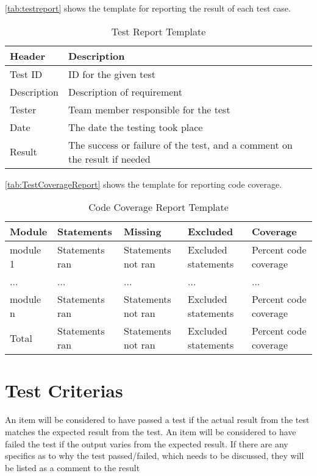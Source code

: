 \autoref{tab:testreport} shows the template for reporting the result of each test case.

\begin{table}[htb] \small \center
\caption{Test Report Template \label{tab:testreport}}
\begin{tabular}{l l}
	\toprule
	Header & Description \\
	\midrule
	Test ID & ID for the given test \\
	Description & Description of requirement \\
	Tester & Team member responsible for the test \\
	Date & The date the testing took place \\
	Result & The success or failure of the test, and a comment on the result if needed \\
	\bottomrule
\end{tabular}
\end{table}

\autoref{tab:TestCoverageReport} shows the template for reporting code coverage.

\begin{table}[!htb]\footnotesize\center
	\caption{Code Coverage Report Template\label{tab:TestCoverageReport}}
	\begin{tabular}{l l l l l}
		\toprule
		Module & Statements & Missing & Excluded & Coverage\\
		\midrule
		module 1 & Statements ran & Statements not ran  & Excluded statements & Percent code coverage\ \\
		... & ... & ... & ... & ... \\
		module n & Statements ran & Statements not ran & Excluded statements  & Percent code coverage \\
		\bottomrule
		Total & Statements ran & Statements not ran & Excluded statements & Percent code coverage \\
		\bottomrule
	\end{tabular}
\end{table}


\section{Test Criterias}
An item will be considered to have passed a test if the actual result from the test matches the expected result from the test. An item will be considered to have failed the test if the output varies from the expected result. If there are any specifics as to why the test passed/failed, which needs to be discussed, they will be listed as a comment to the result


